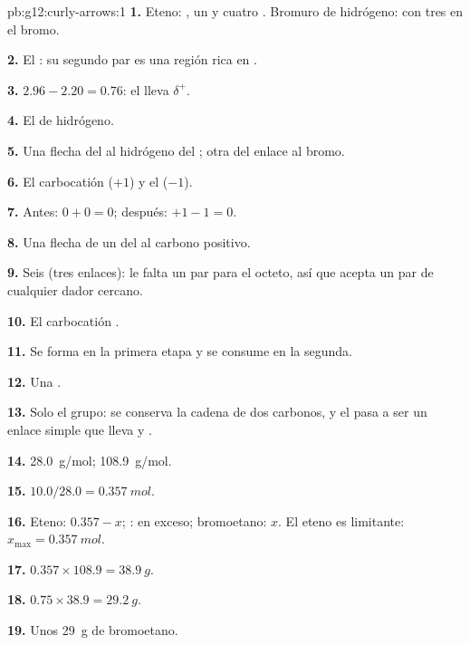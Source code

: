 \begin{solution}{pb:g12:curly-arrows:1}
\textbf{1.} Eteno: , un  y cuatro .
Bromuro de hidrógeno:  con tres  en el bromo.

\textbf{2.} El : su segundo par es una región rica en
.

\textbf{3.} $2.96 - 2.20 = 0.76$: el  lleva $\delta^+$.

\textbf{4.} El  de hidrógeno.

\textbf{5.} Una flecha del  al hidrógeno del ; otra
del enlace  al bromo.

\textbf{6.} El carbocatión  ($+1$) y el  ($-1$).

\textbf{7.} Antes: $0 + 0 = 0$; después: $+1 - 1 = 0$.

\textbf{8.} Una flecha de un  del  al carbono positivo.

\textbf{9.} Seis (tres enlaces): le falta un par para el octeto, así que
acepta un par de cualquier dador cercano.

\textbf{10.} El carbocatión .

\textbf{11.} Se forma en la primera etapa y se consume en la segunda.

\textbf{12.} Una .

\textbf{13.} Solo el grupo: se conserva la cadena de dos carbonos, y el
 pasa a ser un enlace simple que lleva  y .

\textbf{14.} \qty{28.0}{g/mol}; \qty{108.9}{g/mol}.

\textbf{15.} $10.0 / 28.0 = \qty{0.357}{mol}$.

\textbf{16.} Eteno: $0.357 - x$; : en exceso; bromoetano: $x$.
El eteno es limitante: $x_{\max} = \qty{0.357}{mol}$.

\textbf{17.} $0.357 \times 108.9 = \qty{38.9}{g}$.

\textbf{18.} $0.75 \times 38.9 = \qty{29.2}{g}$.

\textbf{19.} Unos \qty{29}{g} de bromoetano.
\end{solution}
